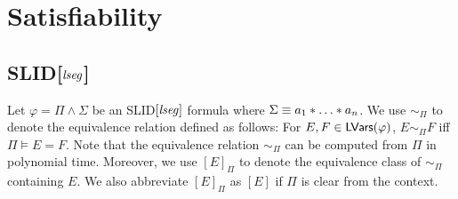 \documentclass{llncs}
\newcommand{\tl}[1]{\color{blue} {TL: #1 :LT} \color{black}}
\begin{document}
%
%

%
%




\section{Satisfiability}

\subsection{SLID[$\mathit{lseg}$]}

Let $\varphi = \Pi \wedge \Sigma$ be an SLID$[\mathit{lseg}]$ formula where $\Sigma \equiv a_1 \sep \dots \sep a_n$. We use $\sim_\Pi$ to denote the equivalence relation defined as follows: For $E,F \in \mathsf{LVars}(\varphi)$, $E \sim_\Pi F$ iff $\Pi \models E = F$. Note that the equivalence relation $\sim_\Pi$ can be computed from $\Pi$ in polynomial time. Moreover, we use $[E]_\Pi$ to denote the equivalence class of $\sim_\Pi$ containing $E$. We also abbreviate $[E]_\Pi$ as $[E]$ if $\Pi$ is clear from the context.
\end{document}
